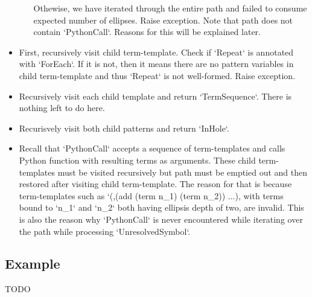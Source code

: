 \begin{itemize}
\begin{itemize}
	  Othewise, we have iterated through the entire path and failed to consume expected number of ellipses. Raise exception. Note that path does not contain `PythonCall`. Reasons for this will be explained later.
	\end{itemize}
\item
\TermRepeat First, recursively visit child term-template. Check if `Repeat` is annotated with `ForEach`. If it is not, then it means there are no pattern variables in child term-template and thus `Repeat` is not well-formed. Raise exception.
\item
\TermSequence Recursively visit each child template and return `TermSequence`. There is nothing left to do here.
\item
\TermInHole Recurisvely visit both child patterns and return `InHole`.
\item
\PythonCall Recall that `PythonCall` accepts a sequence of term-templates and calls Python function with resulting terms as arguments. These child term-templates must be visited recursively but path must be emptied out and then restored after visiting child term-template. The reason for that is because term-templates such as `(,(add (term n\_1) (term n\_2)) ...), with terms bound to `n\_1` and `n\_2` both having ellipsis depth of two, are invalid. This is also the reason why `PythonCall` is never encountered while iterating over the path while processing `UnresolvedSymbol`.
\end{itemize}


\subsection{Example}
TODO


